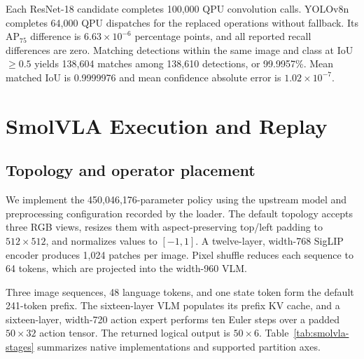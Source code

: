 \documentclass[sigplan,screen,review]{acmart}
\begin{document}
Each ResNet-18 candidate completes 100,000 QPU convolution calls. YOLOv8n completes 64,000 QPU dispatches for the replaced operations without fallback. Its AP$_{75}$ difference is \(6.63\times10^{-6}\) percentage points, and all reported recall differences are zero. Matching detections within the same image and class at IoU \(\geq0.5\) yields 138,604 matches among 138,610 detections, or 99.9957\%. Mean matched IoU is 0.9999976 and mean confidence absolute error is \(1.02\times10^{-7}\).

\section{SmolVLA Execution and Replay}
\label{app:smolvla}

\subsection{Topology and operator placement}

We implement the 450,046,176-parameter  policy using the upstream model and preprocessing configuration recorded by the loader. The default topology accepts three RGB views, resizes them with aspect-preserving top/left padding to \(512\times512\), and normalizes values to \([-1,1]\). A twelve-layer, width-768 SigLIP encoder produces 1,024 patches per image. Pixel shuffle reduces each sequence to 64 tokens, which are projected into the width-960 VLM.

Three image sequences, 48 language tokens, and one state token form the default 241-token prefix. The sixteen-layer VLM populates its prefix KV cache, and a sixteen-layer, width-720 action expert performs ten Euler steps over a padded \(50\times32\) action tensor. The returned logical output is \(50\times6\). Table~\ref{tab:smolvla-stages} summarizes native implementations and supported partition axes.
\end{document}
